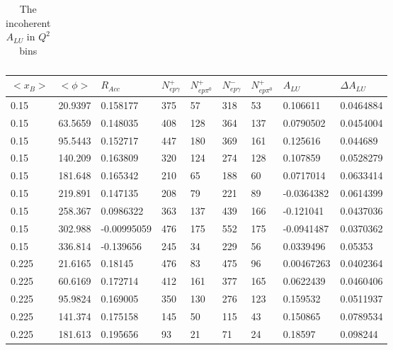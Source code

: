 \documentclass[12pt]{article}
\begin{document}
\begin{table}[!h]
\begin{center}
\begin{tabular}{||l|l|l|l|l|l|l|l|l||}
         
         \hline
 \hline
      \end{tabular}
      \caption{The incoherent $A_{LU}$ in $Q^2$ bins}
      \label{table:InCoh_Q2_BSA}
   \end{center}
\end{table}


\begin{table}[!h]
   \begin{center}
      \begin{tabular}{||l|l|l|l|l|l|l|l|l||}
         \hline
 
$<x_{B}>$ & $<\phi>$ &$R_{Acc}$    &$N^{+}_{ep\gamma}$    &$N^{+}_{ep\pi^{0}}$   &$N^{-}_{ep\gamma}$   &$N^{+}_{ep\pi^{0}}$    &$A_{LU}$    &$\Delta A_{LU}$\\
\hline
\hline
0.15    &20.9397    &0.158177    &375    &57   &318   &53    &0.106611    &0.0464884\\
0.15    &63.5659    &0.148035    &408    &128   &364   &137    &0.0790502    &0.0454004\\
0.15    &95.5443    &0.152717    &447    &180   &369   &161    &0.125616    &0.044689\\
0.15    &140.209    &0.163809    &320    &124   &274   &128    &0.107859    &0.0528279\\
0.15    &181.648    &0.165342    &210    &65   &188   &60    &0.0717014    &0.0633414\\
0.15    &219.891    &0.147135    &208    &79   &221   &89    &-0.0364382    &0.0614399\\
0.15    &258.367    &0.0986322    &363    &137   &439   &166    &-0.121041    &0.0437036\\
0.15    &302.988    &-0.00995059    &476    &175   &552   &175    &-0.0941487    &0.0370362\\
0.15    &336.814    &-0.139656    &245    &34   &229   &56    &0.0339496    &0.05353\\
\hline
0.225    &21.6165    &0.18145    &476    &83   &475   &96    &0.00467263    &0.0402364\\
0.225    &60.6169    &0.172714    &412    &161   &377   &165    &0.0622439    &0.0460406\\
0.225    &95.9824    &0.169005    &350    &130   &276   &123    &0.159532    &0.0511937\\
0.225    &141.374    &0.175158    &145    &50   &115   &43    &0.150865    &0.0789534\\
0.225    &181.613    &0.195656    &93    &21   &71   &24    &0.18597    &0.098244\\

\end{tabular}
\end{center}
\end{table}
\end{document}
